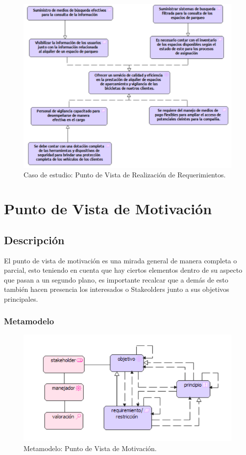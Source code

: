 \begin{figure}[H]
	\centering
	\includegraphics[width=1.0\textwidth]{imagenes/Caso_Estudio/Motivacion/Realizacion_Requerimientos.PDF}
	\caption{Caso de estudio: Punto de Vista de Realización de Requerimientos.}
	\label{fig:gap_analysis}
\end{figure}


\section{Punto de Vista de Motivación}
\subsection{Descripción}
El punto de vista de motivación es una mirada general de manera completa o parcial, esto teniendo en cuenta que hay ciertos elementos dentro de su aspecto que pasan a un segundo plano, es importante recalcar que a demás de esto también hacen presencia los interesados o Stakeolders junto a sus objetivos principales.
\subsubsection{Metamodelo}
\begin{figure}[H]
	\centering
	\includegraphics[width=1.0\textwidth]{imagenes/Metamodelos/Motivacion/meta_Motivacion.pdf}
	\caption{Metamodelo: Punto de Vista de Motivación.}
	\label{fig:gap_analysis}
\end{figure}

